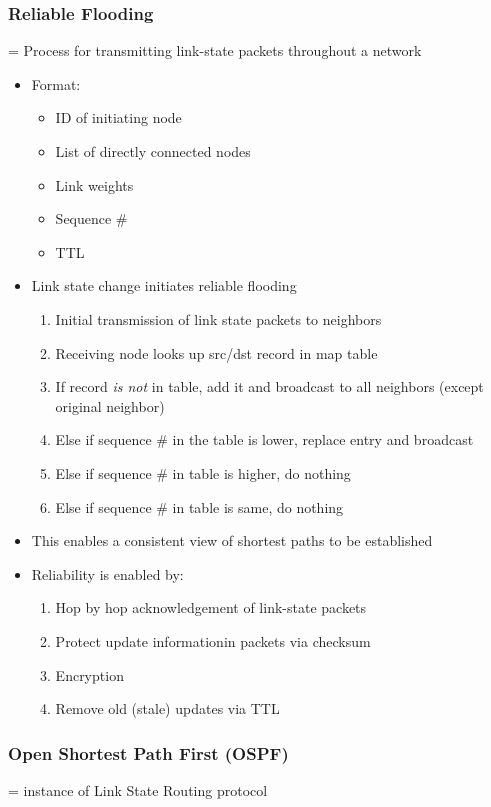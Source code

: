 \documentclass[11pt]{article}
\begin{document}
\subsubsection{Reliable Flooding}
\label{sec:orgheadline87}
= Process for transmitting link-state packets throughout a network
\begin{itemize}
\item Format: 
\begin{itemize}
\item ID of initiating node
\item List of directly connected nodes
\item Link weights
\item Sequence \#
\item TTL
\end{itemize}

\item Link state change initiates reliable flooding
\begin{enumerate}
\item Initial transmission of link state packets to neighbors
\item Receiving node looks up src/dst record in map table
\item If record \emph{is not} in table, add it and broadcast to all
neighbors (except original neighbor)
\item Else if sequence \# in the table is lower, replace entry and
broadcast
\item Else if sequence \# in table is higher, do nothing
\item Else if sequence \# in table is same, do nothing
\end{enumerate}

\item This enables a consistent view of shortest paths to be established
\item Reliability is enabled by:
\begin{enumerate}
\item Hop by hop acknowledgement of link-state packets
\item Protect update informationin packets via checksum
\item Encryption
\item Remove old (stale) updates via TTL
\end{enumerate}
\end{itemize}

\subsubsection{Open Shortest Path First (OSPF)}
\label{sec:orgheadline88}
= instance of Link State Routing protocol
\end{document}
